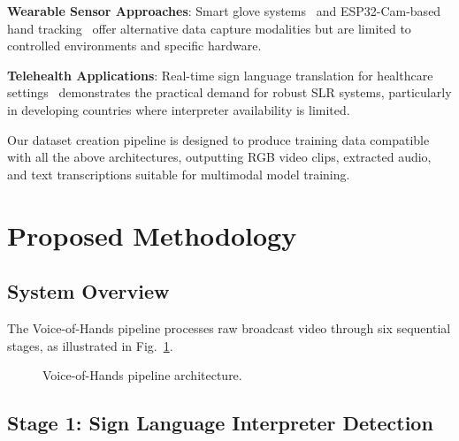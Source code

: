 \documentclass[journal]{IEEEtran}
\begin{document}
\textbf{Wearable Sensor Approaches}: Smart glove systems~\cite{wen2021ai} and ESP32-Cam-based hand tracking~\cite{kumar2023indian} offer alternative data capture modalities but are limited to controlled environments and specific hardware.

\textbf{Telehealth Applications}: Real-time sign language translation for healthcare settings~\cite{mishra2023deep} demonstrates the practical demand for robust SLR systems, particularly in developing countries where interpreter availability is limited.

Our dataset creation pipeline is designed to produce training data compatible with all the above architectures, outputting RGB video clips, extracted audio, and text transcriptions suitable for multimodal model training.

\section{Proposed Methodology}
\label{sec:methodology}

\subsection{System Overview}

The Voice-of-Hands pipeline processes raw broadcast video through six sequential stages, as illustrated in Fig.~\ref{fig:pipeline}.

\begin{figure}[htbp]
\centering
{}
\caption{Voice-of-Hands pipeline architecture.}
\label{fig:pipeline}
\end{figure}

\subsection{Stage 1: Sign Language Interpreter Detection}
\end{document}
